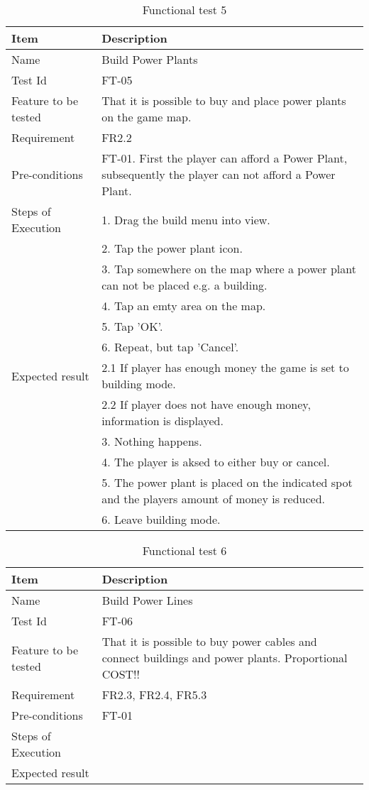 \begin{table}[H]
\centering
	\begin{tabular}{ l | p{8cm} }
		\hline
		{\bf Item} & {\bf Description} \\ \hline
		Name & Build Power Plants \\ 
		Test Id & FT-05 \\ 
		Feature to be tested & That it is possible to buy and place power plants on the game map. \\ 
		Requirement & FR2.2 \\ 
		Pre-conditions & FT-01. First the player can afford a Power Plant, subsequently the player can not afford a Power Plant. \\
		Steps of Execution & 1. Drag the build menu into view. \\ 
		& 2. Tap the power plant icon. \\
		& 3. Tap somewhere on the map where a power plant can not be placed e.g. a building. \\
		& 4. Tap an emty area on the map. \\
		& 5. Tap 'OK'. \\
		& 6. Repeat, but tap 'Cancel'. \\
		Expected result & 2.1 If player has enough money the game is set to building mode. \\
		& 2.2 If player does not have enough money, information is displayed. \\
		& 3. Nothing happens. \\ 
		& 4. The player is aksed to either buy or cancel. \\
		& 5. The power plant is placed on the indicated spot and the players amount of money is reduced. \\
		& 6. Leave building mode. \\
	\end{tabular}
	\caption{Functional test 5}
\end{table}

\begin{table}[H]
\centering
	\begin{tabular}{ l | p{8cm} }
		\hline
		{\bf Item} & {\bf Description} \\ \hline
		Name & Build Power Lines \\ 
		Test Id & FT-06 \\ 
		Feature to be tested &  That it is possible to buy power cables and connect buildings and power plants. Proportional COST!! \\ 
		Requirement & FR2.3, FR2.4, FR5.3 \\ 
		Pre-conditions & FT-01 \\ 
		Steps of Execution & \\ 
		Expected result & \\ 
	\end{tabular}
	\caption{Functional test 6}
\end{table}















